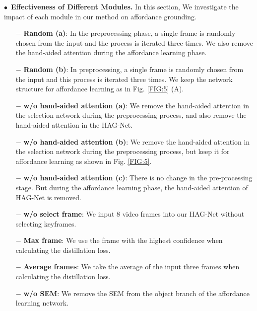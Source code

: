 \documentclass[journal,twoside]{IEEEtran}
\newcommand{\myPara}[1]{\vspace{5pt}\noindent$\bullet$~\textbf{#1} \quad}
\begin{document}
\myPara{Effectiveness of Different Modules.}
In this section, We investigate the impact of each module in our method on affordance grounding.

\begin{itemize}
\item [$\bm{-}$]
\textbf{Random (a)}: In the preprocessing phase, a single frame is randomly chosen from the input and the process is iterated three times. We also remove the hand-aided attention during the affordance learning phase.

\item [$\bm{-}$]
\textbf{Random (b)}: In preprocessing, a single frame is randomly chosen from the input and this process is iterated three times. We keep the network structure for affordance learning as in Fig. \ref{FIG:5} (A).

\item [$\bm{-}$]
\textbf{w/o hand-aided attention (a)}: We remove the hand-aided attention in the selection network during the preprocessing process, and also remove the hand-aided attention in the HAG-Net.

\item [$\bm{-}$]
\textbf{w/o hand-aided attention (b)}: We remove the hand-aided attention in the selection network during the preprocessing process, but keep it for affordance learning as shown in Fig. \ref{FIG:5}.

\item [$\bm{-}$]
\textbf{w/o hand-aided attention (c)}: There is no change in the pre-processing stage. But during the affordance learning phase, the hand-aided attention of HAG-Net is removed.

\item[$\bm{-}$]
\textbf{w/o select frame}: We input 8 video frames into our HAG-Net without selecting keyframes.

\item [$\bm{-}$]
\textbf{Max frame}: We use the frame with the highest confidence when calculating the distillation loss.

\item [$\bm{-}$]
\textbf{Average frames}: We take the average of the input three frames when calculating the distillation loss.

\item [$\bm{-}$]
\textbf{w/o SEM}: We remove the SEM from the object branch of the affordance learning network.
\end{itemize}
\end{document}
